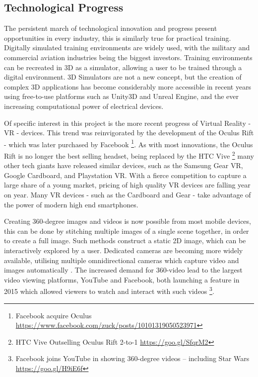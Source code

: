 \documentclass[ %
                    author={Elis Jones},
                supervisor={Dr. Kirsten Cater},
                    degree={BSc},
                     title={The Effect of Presentation Medium on Spatial Cognition},
                  subtitle={in the Virtual Environment},
                      year={2018} ]{dissertation}
\begin{document}
\subsection{Technological Progress} \label{tech_progress}
The persistent march of technological innovation and progress present opportunities in every  industry, this is similarly true for practical training. Digitally simulated training environments are widely used, with the military and commercial aviation industries being the biggest investors. Training environments can be recreated in 3D as a simulator, allowing a user to be trained through a digital environment. 3D Simulators are not a new concept, but the creation of complex 3D applications has become considerably more accessible in recent years using free-to-use platforms such as Unity3D and Unreal Engine, and the ever increasing computational power of electrical devices. 

Of specific interest in this project is the more recent progress of Virtual Reality - VR - devices. This trend was reinvigorated by the development of the Oculus Rift - which was later purchased by Facebook \footnote{Facebook acquire Oculus \url{https://www.facebook.com/zuck/posts/10101319050523971}}. As with most innovations, the Oculus Rift is no longer the best selling headset, being replaced by the HTC Vive \footnote{HTC Vive Outselling Oculus Rift 2-to-1 \url{https://goo.gl/SfqrM2}} many other tech giants have released similar devices, such as the Samsung Gear VR, Google Cardboard, and Playstation VR. With a fierce competition to capture a large share of a young market, pricing of high quality VR devices are falling year on year. Many VR devices - such as the Cardboard and Gear - take advantage of the power of modern high end smartphones. 

Creating 360-degree images and videos is now possible from most mobile devices, this can be done by stitching multiple images of a single scene together, in order to create a full image. Such methods construct a static 2D image, which can be interactively explored by a user. Dedicated cameras are becoming more widely available, utilising multiple omnidirectional cameras which capture video and images automatically . The increased demand for 360-video lead to the largest video viewing platforms, YouTube and Facebook, both launching a feature in 2015 which allowed viewers to watch and interact with such videos \footnote{Facebook joins YouTube in showing 360-degree videos – including Star Wars \url{https://goo.gl/H9iE6f}}. 
\end{document}
